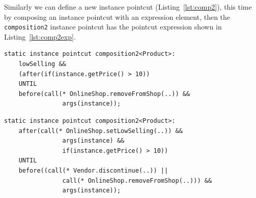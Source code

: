 \documentclass{acm_proc_article-sp}
\begin{document}
Similarly we can define a new instance pointcut (Listing~\ref{lst:comp2}), this time by composing an instance pointcut with an expression element, then the \texttt{composition2} instance pointcut has the pointcut expression shown in Listing~\ref{lst:comp2exp}.

\begin{lstlisting}[float=h!, caption={An instance pointcut and an expression is composed}, label={lst:comp2}]
static instance pointcut composition2<Product>: 
	lowSelling && 
	(after(if(instance.getPrice() > 10)) 
	UNTIL 
	before(call(* OnlineShop.removeFromShop(..)) && 
				args(instance));
\end{lstlisting}


\begin{lstlisting}[float=h!, caption={The composition2 instance pointcut after composition}, label={lst:comp2exp}]
static instance pointcut composition2<Product>: 
	after(call(* OnlineShop.setLowSelling(..)) && 
				args(instance) && 
				if(instance.getPrice() > 10)) 
	UNTIL
	before((call(* Vendor.discontinue(..)) || 
				call(* OnlineShop.removeFromShop(..))) && 
				args(instance));
\end{lstlisting}
\end{document}
